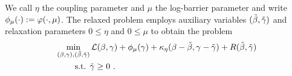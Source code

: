 We call $\eta$ the coupling parameter and $\mu$ the log-barrier parameter
and write $\phi_\mu(\cdot):=\varphi(\cdot,\mu)$.
The relaxed problem employs 
auxiliary variables $(\tilde\beta,{\tilde{\gamma}})$ 
and relaxation parameters $0\le\eta$ and $0\le \mu$
to obtain the problem 
\begin{equation}\label{eq:relax} 
\begin{aligned}%
\min_{\bg, \tbg} & \LL(\beta, \gamma) 
	+\phi_\mu(\gam)+\kappa_\eta(\beta-\tbeta,\gam-\tgam)
+ R(\tbeta, \tgamma) 
\\
\text{s.t. } & \tgamma \geq 0\ .
\end{aligned}
\end{equation}

